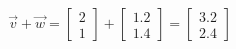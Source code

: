 \documentclass[preview]{standalone}
\begin{document}
\begin{align*}
\vec{v}+\vec{w}= \begin{bmatrix}2\\1\end{bmatrix} + \begin{bmatrix}1.2\\1.4\end{bmatrix} = \begin{bmatrix}3.2\\2.4\end{bmatrix}
\end{align*}
\end{document}
